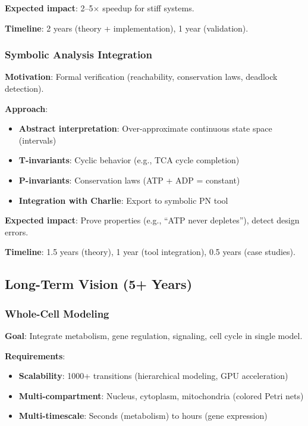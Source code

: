\textbf{Expected impact}: 2--5$\times$ speedup for stiff systems.

\textbf{Timeline}: 2 years (theory + implementation), 1 year (validation).

\subsubsection{Symbolic Analysis Integration}

\textbf{Motivation}: Formal verification (reachability, conservation laws, deadlock detection).

\textbf{Approach}:
\begin{itemize}
    \item \textbf{Abstract interpretation}: Over-approximate continuous state space (intervals)
    \item \textbf{T-invariants}: Cyclic behavior (e.g., TCA cycle completion)
    \item \textbf{P-invariants}: Conservation laws (ATP + ADP = constant)
    \item \textbf{Integration with Charlie}: Export to symbolic PN tool
\end{itemize}

\textbf{Expected impact}: Prove properties (e.g., ``ATP never depletes''), detect design errors.

\textbf{Timeline}: 1.5 years (theory), 1 year (tool integration), 0.5 years (case studies).

\subsection{Long-Term Vision (5+ Years)}
\label{subsec:long-term}

\subsubsection{Whole-Cell Modeling}

\textbf{Goal}: Integrate metabolism, gene regulation, signaling, cell cycle in single model.

\textbf{Requirements}:
\begin{itemize}
    \item \textbf{Scalability}: 1000+ transitions (hierarchical modeling, GPU acceleration)
    \item \textbf{Multi-compartment}: Nucleus, cytoplasm, mitochondria (colored Petri nets)
    \item \textbf{Multi-timescale}: Seconds (metabolism) to hours (gene expression)
\end{itemize}

